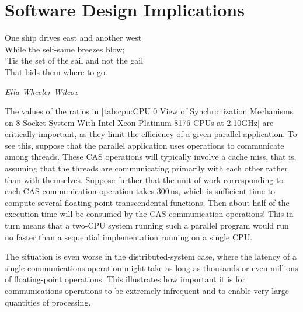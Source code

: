 
\section{Software Design Implications}
\label{sec:cpu:Software Design Implications}
%
\epigraph{One ship drives east and another west \\
	  While the self-same breezes blow; \\
	  'Tis the set of the sail and not the gail \\
	  That bids them where to go.}
	 {\emph{Ella Wheeler Wilcox}}

The values of the ratios in
\cref{tab:cpu:CPU 0 View of Synchronization Mechanisms on 8-Socket System With Intel Xeon Platinum 8176 CPUs at 2.10GHz}
are critically important, as they limit the
efficiency of a given parallel application.
To see this, suppose that the parallel application uses 
operations to communicate among threads.
These CAS operations will typically involve a cache miss, that is, assuming
that the threads are communicating primarily with each other rather than
with themselves.
Suppose further that the unit of work corresponding to each CAS communication
operation takes 300\,ns, which is sufficient time to compute several
floating-point transcendental functions.
Then about half of the execution time will be consumed by the CAS
communication operations!
This in turn means that a two-CPU system running such a parallel program
would run no faster than a sequential implementation running on a
single CPU\@.

The situation is even worse in the distributed-system case, where the
latency of a single communications operation might take as long as
thousands or even millions of floating-point operations.
This illustrates how important it is for communications operations to
be extremely infrequent and to enable very large quantities of processing.

